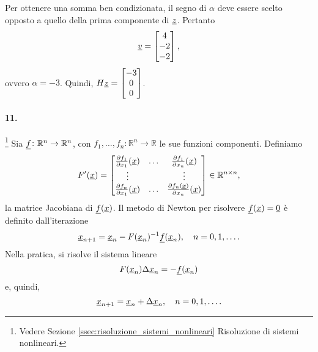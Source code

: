 Per ottenere una somma ben condizionata, il segno di $\alpha$ deve essere scelto opposto a quello della prima componente di $\uline z$. Pertanto
\begin{equation*}
	\uline v = 
	\begin{bmatrix}
		4\\
		-2\\
		-2
	\end{bmatrix},
\end{equation*}
ovvero $\alpha = -3$. Quindi, $H\uline z =
\begin{bmatrix}
	-3\\
	0\\
	0
\end{bmatrix}$.

\paragraph{11.}\footnote{Vedere Sezione \ref{ssec:risoluzione_sistemi_nonlineari} Risoluzione di sistemi nonlineari.} Sia $\uline f\colon\mathbb{R}^n\rightarrow \mathbb{R}^n$, con $f_1,\hdots, f_n\colon\mathbb{R}^n\rightarrow\mathbb{R}$ le sue funzioni componenti. Definiamo
\begin{equation*}
	F'(\uline x)=
	\begin{bmatrix}
		\frac{\partial f_1}{\partial x_1}(\uline x) & \hdots & \frac{\partial f_1}{\partial x_n}(\uline x)\\
		\vdots & &\vdots\\
		\frac{\partial f_n}{\partial x_1}(\uline x) & \hdots & \frac{\partial f_n(\uline x)}{\partial x_n}(\uline x)
	\end{bmatrix}\in\mathbb R^{n\times n},
\end{equation*}
la matrice Jacobiana di $\uline f(\uline x)$. Il metodo di Newton per risolvere $\uline f(\uline x)=\uline 0$ è definito dall'iterazione
\begin{equation*}
	\uline x_{n+1} = \uline x_n - F(\uline x_n)^{-1}\uline f(\uline x_n),\quad n=0,1,\hdots.
\end{equation*}
Nella pratica, si risolve il sistema lineare
\begin{equation*}
	F(\uline x_n)\Delta\uline x_n = -\uline f(\uline x_n)
\end{equation*}
e, quindi,
\begin{equation*}
	\uline x_{n+1} = \uline x_n + \Delta \uline x_n,\quad n = 0, 1, \hdots.
\end{equation*}